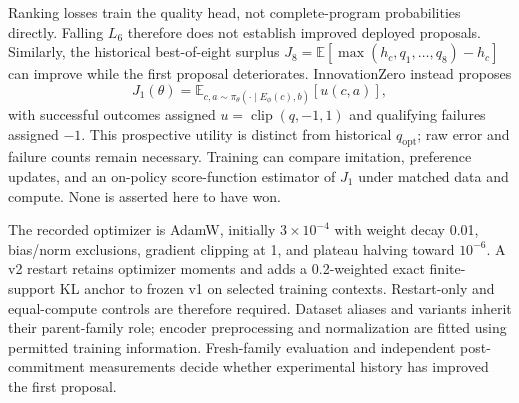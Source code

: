 Ranking losses train the quality head, not complete-program probabilities
directly. Falling $L_6$ therefore does not establish improved deployed
proposals. Similarly, the historical best-of-eight surplus
$J_8=\mathbb{E}[\max(h_c,q_1,\ldots,q_8)-h_c]$ can improve while the first
proposal deteriorates. InnovationZero instead proposes
\begin{equation}
 J_1(\theta)=\mathbb{E}_{c,a\sim\pi_\theta(\cdot\mid E_\phi(c),b)}[u(c,a)],
 \label{eq:first-proposal-objective}
\end{equation}
with successful outcomes assigned $u=\operatorname{clip}(q,-1,1)$ and qualifying
failures assigned $-1$. This prospective utility is distinct from historical
$q_{\mathrm{opt}}$; raw error and failure counts remain necessary. Training can
compare imitation, preference updates, and an on-policy score-function estimator
of $J_1$ under matched data and compute. None is asserted here to have won.

The recorded optimizer is AdamW, initially $3\times10^{-4}$ with weight decay
0.01, bias/norm exclusions, gradient clipping at 1, and plateau halving toward
$10^{-6}$. A v2 restart retains optimizer moments and adds a 0.2-weighted exact
finite-support KL anchor to frozen v1 on selected training contexts. Restart-only
and equal-compute controls are therefore required. Dataset aliases and variants
inherit their parent-family role; encoder preprocessing and normalization are
fitted using permitted training information. Fresh-family evaluation and
independent post-commitment measurements decide whether experimental history
has improved the first proposal.
